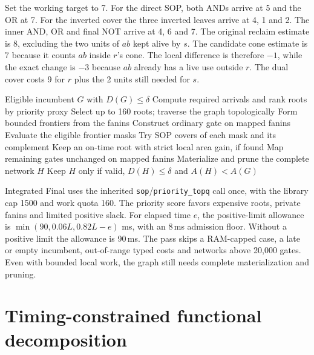 \documentclass[journal,10pt]{IEEEtran}
\begin{document}
Set the working target to 7. For the direct SOP, both ANDs arrive at 5 and the OR at 7. For the inverted cover the three inverted leaves arrive at 4, 1 and 2. The inner AND, OR and final NOT arrive at 4, 6 and 7. The original reclaim estimate is 8, excluding the two units of \(ab\) kept alive by \(s\). The candidate cone estimate is 7 because it counts \(ab\) inside \(r\)'s cone. The local difference is therefore \(-1\), while the exact change is \(-3\) because \(ab\) already has a live use outside \(r\). The dual cover costs 9 for \(r\) plus the 2 units still needed for \(s\).

\begin{algorithm}[!t]
\caption{Inherited SOP polish on the integrated incumbent}
\label{alg:sop}
\footnotesize
\begin{algorithmic}[1]
\Require Eligible incumbent \(G\) with \(D(G)\le\delta\)
\State Compute required arrivals and rank roots by priority proxy
\State Select up to 160 roots; traverse the graph topologically
  \State Form bounded frontiers from the fanins
  \State Construct ordinary gate on mapped fanins
    \State Evaluate the eligible frontier masks
    \State Try SOP covers of each mask and its complement
    \State Keep an on-time root with strict local area gain, if found
  \EndIf
\EndFor
\State Map remaining gates unchanged on mapped fanins
\State Materialize and prune the complete network \(H\)
\State Keep \(H\) only if valid, \(D(H)\le\delta\) and \(A(H)<A(G)\)
\end{algorithmic}
\end{algorithm}

Integrated Final uses the inherited \texttt{sop}/\texttt{priority\_topq} call once, with the library cap 1500 and work quota 160. The priority score favors expensive roots, private fanins and limited positive slack. For elapsed time \(e\), the positive-limit allowance is \(\min(90,0.06L,0.82L-e)\) ms, with an 8\,ms admission floor. Without a positive limit the allowance is 90\,ms. The pass skips a RAM-capped case, a late or empty incumbent, out-of-range typed costs and networks above 20,000 gates. Even with bounded local work, the graph still needs complete materialization and pruning.

\section{Timing-constrained functional decomposition}
\label{sec:recovery}
\end{document}
